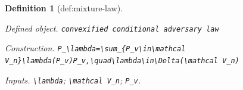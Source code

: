 \documentclass{article}
\newtheorem{definition}{Definition}
\begin{document}
\begin{definition}[def:mixture-law]\label{def:mixture-law}
\par\smallskip\noindent\emph{Defined object.} \texttt{convexified conditional adversary law}
\par\smallskip\noindent\emph{Construction.} \texttt{P\_\allowbreak{}\textbackslash{}\allowbreak{}lambda=\allowbreak{}\textbackslash{}\allowbreak{}sum\_\allowbreak{}\{P\_\allowbreak{}v\textbackslash{}\allowbreak{}in\textbackslash{}\allowbreak{}mathcal V\_\allowbreak{}n\}\allowbreak{}\textbackslash{}\allowbreak{}lambda(P\_\allowbreak{}v)P\_\allowbreak{}v,\allowbreak{}\textbackslash{}\allowbreak{}quad\textbackslash{}\allowbreak{}lambda\textbackslash{}\allowbreak{}in\textbackslash{}\allowbreak{}Delta(\textbackslash{}\allowbreak{}mathcal V\_\allowbreak{}n)}
\par\smallskip\noindent\emph{Inputs.} \texttt{\textbackslash{}\allowbreak{}lambda}; \texttt{\textbackslash{}\allowbreak{}mathcal V\_\allowbreak{}n}; \texttt{P\_\allowbreak{}v}.
\end{definition}
\end{document}
